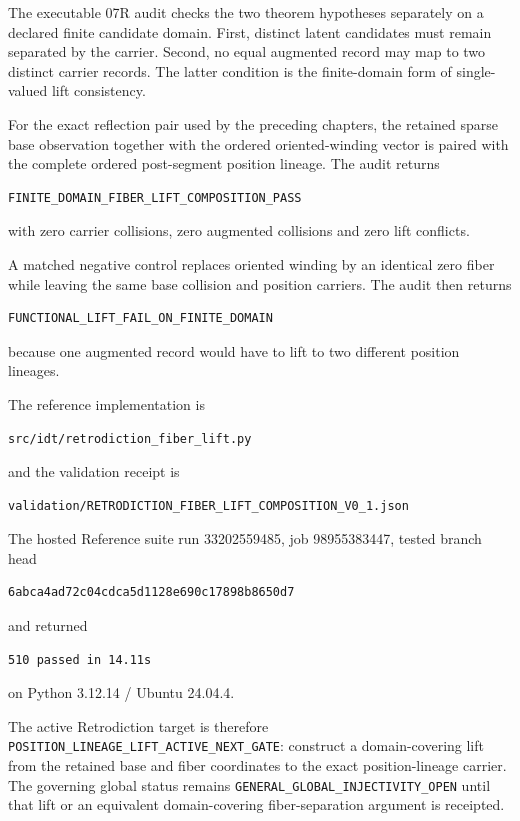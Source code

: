 The executable 07R audit checks the two theorem hypotheses separately on a declared finite candidate domain.  First, distinct latent candidates must remain separated by the carrier.  Second, no equal augmented record may map to two distinct carrier records.  The latter condition is the finite-domain form of single-valued lift consistency.

For the exact reflection pair used by the preceding chapters, the retained sparse base observation together with the ordered oriented-winding vector is paired with the complete ordered post-segment position lineage.  The audit returns
\begin{verbatim}
FINITE_DOMAIN_FIBER_LIFT_COMPOSITION_PASS
\end{verbatim}
with zero carrier collisions, zero augmented collisions and zero lift conflicts.

A matched negative control replaces oriented winding by an identical zero fiber while leaving the same base collision and position carriers.  The audit then returns
\begin{verbatim}
FUNCTIONAL_LIFT_FAIL_ON_FINITE_DOMAIN
\end{verbatim}
because one augmented record would have to lift to two different position lineages.

The reference implementation is
\begin{verbatim}
src/idt/retrodiction_fiber_lift.py
\end{verbatim}
and the validation receipt is
\begin{verbatim}
validation/RETRODICTION_FIBER_LIFT_COMPOSITION_V0_1.json
\end{verbatim}
The hosted Reference suite run 33202559485, job 98955383447, tested branch head
\begin{verbatim}
6abca4ad72c04cdca5d1128e690c17898b8650d7
\end{verbatim}
and returned
\begin{verbatim}
510 passed in 14.11s
\end{verbatim}
on Python 3.12.14 / Ubuntu 24.04.4.

The active Retrodiction target is therefore \texttt{POSITION\_LINEAGE\_LIFT\_ACTIVE\_NEXT\_GATE}: construct a domain-covering lift from the retained base and fiber coordinates to the exact position-lineage carrier.  The governing global status remains \texttt{GENERAL\_GLOBAL\_INJECTIVITY\_OPEN} until that lift or an equivalent domain-covering fiber-separation argument is receipted.


